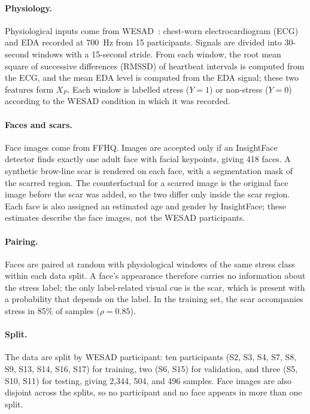 \paragraph{Physiology.} Physiological inputs come from WESAD~\cite{schmidt2018}: chest-worn electrocardiogram (ECG) and EDA recorded at 700~Hz from 15 participants. Signals are divided into 30-second windows with a 15-second stride. From each window, the root mean square of successive differences (RMSSD) of heartbeat intervals is computed from the ECG, and the mean EDA level is computed from the EDA signal; these two features form $X_P$. Each window is labelled stress ($Y = 1$) or non-stress ($Y = 0$) according to the WESAD condition in which it was recorded.

\paragraph{Faces and scars.} Face images come from FFHQ. Images are accepted only if an InsightFace detector finds exactly one adult face with facial keypoints, giving 418 faces. A synthetic brow-line scar is rendered on each face, with a segmentation mask of the scarred region. The counterfactual for a scarred image is the original face image before the scar was added, so the two differ only inside the scar region. Each face is also assigned an estimated age and gender by InsightFace; these estimates describe the face images, not the WESAD participants.

\paragraph{Pairing.} Faces are paired at random with physiological windows of the same stress class within each data split. A face's appearance therefore carries no information about the stress label; the only label-related visual cue is the scar, which is present with a probability that depends on the label. In the training set, the scar accompanies stress in 85\% of samples ($\rho = 0.85$).

\paragraph{Split.} The data are split by WESAD participant: ten participants (S2, S3, S4, S7, S8, S9, S13, S14, S16, S17) for training, two (S6, S15) for validation, and three (S5, S10, S11) for testing, giving 2,344, 504, and 496 samples. Face images are also disjoint across the splits, so no participant and no face appears in more than one split.

